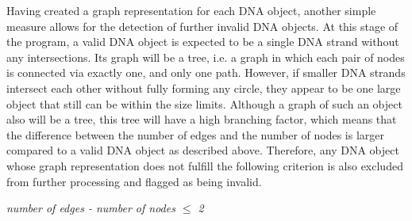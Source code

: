 \documentclass{article}
\begin{document}
Having created a graph representation for each DNA object, another simple measure allows for the detection of further invalid DNA objects. At this stage of the program, a valid DNA object is expected to be a single DNA strand without any intersections. Its graph will be a tree, i.e. a graph in which each pair of nodes is connected via exactly one, and only one path. However, if smaller DNA strands intersect each other without fully forming any circle, they appear to be one large object that still can be within the size limits. Although a graph of such an object also will be a tree, this tree will have a high branching factor, which means that the difference between the number of edges and the number of nodes is larger compared to a valid DNA object as described above. Therefore, any DNA object whose graph representation does not fulfill the following criterion is also excluded from further processing and flagged as being invalid.
\begin{center}\textit{number of edges - number of nodes $\leq$ 2}\end{center}
\end{document}
